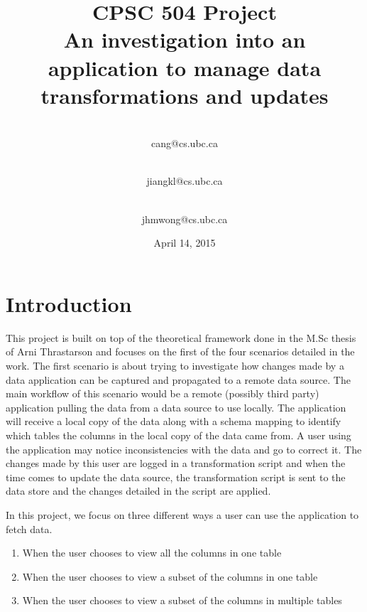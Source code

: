 \documentclass[12pt]{article}
\begin{document}
\begin{titlepage}
\title{\textbf{CPSC 504 Project\\\vspace{3 cm}\Huge{An investigation into an application to manage data transformations and updates}\vspace{2 cm}}}
\date{\vspace{2 cm} April 14, 2015}

\author{
 \\cang@cs.ubc.ca\\
  \and {}\\jiangkl@cs.ubc.ca\\
  \and {}\\jhmwong@cs.ubc.ca\\ 
}
\maketitle
\thispagestyle{empty}
\end{titlepage}

\newpage
\section{Introduction}
\label{sec:introduction}
This project is built on top of the theoretical framework done in the M.Sc thesis of Arni Thrastarson \cite{arniThesis} and focuses on the first of the four scenarios detailed in the work. The first scenario is about trying to investigate how changes made by a data application can be captured and propagated to a remote data source. The main workflow of this scenario would be a remote (possibly third party) application pulling the data from a data source to use locally. The application will receive a local copy of the data along with a schema mapping to identify which tables the columns in the local copy of the data came from. A user using the application may notice inconsistencies with the data and go to correct it. The changes made by this user are logged in a transformation script and when the time comes to update the data source, the transformation script is sent to the data store and the changes detailed in the script are applied.

In this project, we focus on three different ways a user can use the application to fetch data.
\begin{enumerate}
	\item {When the user chooses to view all the columns in one table}
	\item {When the user chooses to view a subset of the columns in one table}
	\item {When the user chooses to view a subset of the columns in multiple tables}
\end{enumerate}
\end{document}
